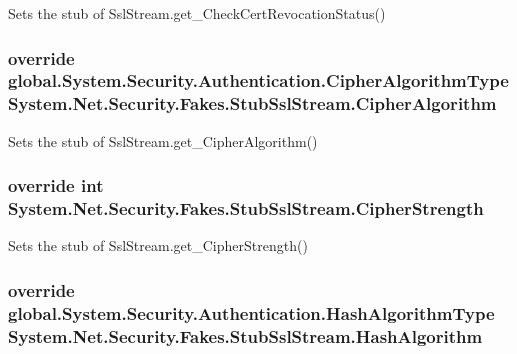 Sets the stub of Ssl\-Stream.\-get\-\_\-\-Check\-Cert\-Revocation\-Status()

\hypertarget{class_system_1_1_net_1_1_security_1_1_fakes_1_1_stub_ssl_stream_a2ee832ed85234bbbce3189b85fe5ca11}{
\subsubsection[{Cipher\-Algorithm}]{\setlength{\rightskip}{0pt plus 5cm}override global.\-System.\-Security.\-Authentication.\-Cipher\-Algorithm\-Type System.\-Net.\-Security.\-Fakes.\-Stub\-Ssl\-Stream.\-Cipher\-Algorithm\hspace{0.3cm}{\ttfamily [get]}}}\label{class_system_1_1_net_1_1_security_1_1_fakes_1_1_stub_ssl_stream_a2ee832ed85234bbbce3189b85fe5ca11}


Sets the stub of Ssl\-Stream.\-get\-\_\-\-Cipher\-Algorithm()

\hypertarget{class_system_1_1_net_1_1_security_1_1_fakes_1_1_stub_ssl_stream_af8cfdee83c3bbe81c17ba9cc01faa63b}{
\subsubsection[{Cipher\-Strength}]{\setlength{\rightskip}{0pt plus 5cm}override int System.\-Net.\-Security.\-Fakes.\-Stub\-Ssl\-Stream.\-Cipher\-Strength\hspace{0.3cm}{\ttfamily [get]}}}\label{class_system_1_1_net_1_1_security_1_1_fakes_1_1_stub_ssl_stream_af8cfdee83c3bbe81c17ba9cc01faa63b}


Sets the stub of Ssl\-Stream.\-get\-\_\-\-Cipher\-Strength()

\hypertarget{class_system_1_1_net_1_1_security_1_1_fakes_1_1_stub_ssl_stream_a4e53b31642c08ad4eafe73ea01d7834c}{
\subsubsection[{Hash\-Algorithm}]{\setlength{\rightskip}{0pt plus 5cm}override global.\-System.\-Security.\-Authentication.\-Hash\-Algorithm\-Type System.\-Net.\-Security.\-Fakes.\-Stub\-Ssl\-Stream.\-Hash\-Algorithm\hspace{0.3cm}{\ttfamily [get]}}}\label{class_system_1_1_net_1_1_security_1_1_fakes_1_1_stub_ssl_stream_a4e53b31642c08ad4eafe73ea01d7834c}


